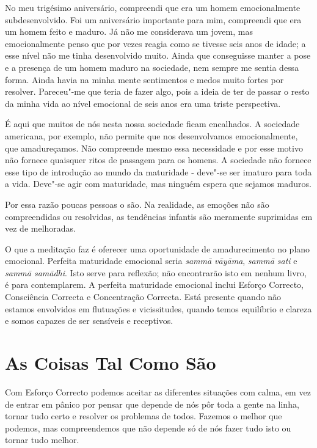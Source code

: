 No meu trigésimo aniversário, compreendi que era um homem emocionalmente
subdesenvolvido. Foi um aniversário importante para mim, compreendi que era um
homem feito e maduro. Já não me considerava um jovem, mas emocionalmente penso
que por vezes reagia como se tivesse seis anos de idade; a esse nível não me
tinha desenvolvido muito. Ainda que conseguisse manter a pose e a presença de um
homem maduro na sociedade, nem sempre me sentia dessa forma. Ainda havia na
minha mente sentimentos e medos muito fortes por resolver. Pareceu"-me que teria
de fazer algo, pois a ideia de ter de passar o resto da minha vida ao nível
emocional de seis anos era uma triste perspectiva.

É aqui que muitos de nós nesta nossa sociedade ficam encalhados. A sociedade
americana, por exemplo, não permite que nos desenvolvamos emocionalmente, que
amadureçamos. Não compreende mesmo essa necessidade e por esse motivo não
fornece quaisquer ritos de passagem para os homens. A sociedade não fornece esse
tipo de introdução ao mundo da maturidade - deve"-se ser imaturo para toda a
vida. Deve"-se agir com maturidade, mas ninguém espera que sejamos maduros.

Por essa razão poucas pessoas o são. Na realidade, as emoções não são
compreendidas ou resolvidas, as tendências infantis são meramente suprimidas em
vez de melhoradas.

\enlargethispage{-\baselineskip}

O que a meditação faz é oferecer uma oportunidade de amadurecimento no plano
emocional. Perfeita maturidade emocional seria \emph{sammā vāyāma}, \emph{sammā
  sati} e \emph{sammā samādhi}. Isto serve para reflexão; não encontrarão isto
em nenhum livro, é para contemplarem. A perfeita maturidade emocional inclui
Esforço Correcto, Consciência Correcta e Concentração Correcta. Está presente quando
não estamos envolvidos em flutuações e vicissitudes, quando temos equilíbrio e
clareza e somos capazes de ser sensíveis e receptivos.

\section{As Coisas Tal Como São}

Com Esforço Correcto podemos aceitar as diferentes situações com calma, em vez
de entrar em pânico por pensar que depende de nós pôr toda a gente na linha,
tornar tudo certo e resolver os problemas de todos. Fazemos o melhor que
podemos, mas compreendemos que não depende só de nós fazer tudo isto ou tornar
tudo melhor.

